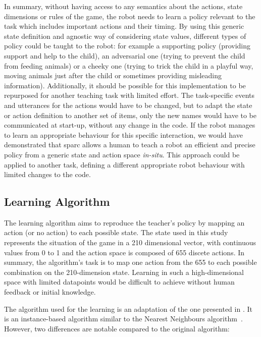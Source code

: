 In summary, without having access to any semantics about the actions, state dimensions or rules of the game, the robot needs to learn a policy relevant to the task which includes important actions and their timing. By using this generic state definition and agnostic way of considering state values, different types of policy could be taught to the robot: for example a supporting policy (providing support and help to the child), an adversarial one (trying to prevent the child from feeding animals) or a cheeky one (trying to trick the child in a playful way, moving animals just after the child or sometimes providing misleading information). Additionally, it should be possible for this implementation to be repurposed for another teaching task with limited effort. The task-specific events and utterances for the actions would have to be changed, but to adapt the state or action definition to another set of items, only the new names would have to be communicated at start-up, without any change in the code. If the robot manages to learn an appropriate behaviour for this specific interaction, we would have demonstrated that \gls{sparc} allows a human to teach a robot an efficient and precise policy from a generic state and action space \emph{in-situ}. This approach could be applied to another task, defining a different appropriate robot behaviour with limited changes to the code.

\subsection{Learning Algorithm} \label{sec:tuto_algo}

The learning algorithm aims to reproduce the teacher's policy by mapping an action (or no action) to each possible state. The state used in this study represents the situation of the game in a 210 dimensional vector, with continuous values from 0 to 1 and the action space is composed of 655 discete actions. In summary, the algorithm's task is to map one action from the 655 to each possible combination on the 210-dimension state. Learning in such a high-dimensional space with limited datapoints would be difficult to achieve without human feedback or initial knowledge.

The algorithm used for the learning is an adaptation of the one presented in \cite{senft2017toward}. It is an instance-based algorithm similar to the Nearest Neighbours algorithm~\citep{cover1967nearest}. However, two differences are notable compared to the original algorithm: 

